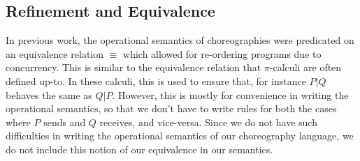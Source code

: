 \documentclass{article}
\theoremstyle{definition}
\begin{document}
\subsection{Refinement and Equivalence}

In previous work, the operational semantics of choreographies were predicated on an equivalence relation $\equiv$ which allowed for re-ordering programs due to concurrency.
This is similar to the equivalence relation that $\pi$-calculi are often defined up-to.
In these calculi, this is used to ensure that, for instance $P|Q$ behaves the same as $Q|P$.
However, this is mostly for convenience in writing the operational semantics, so that we don't have to write rules for both the cases where $P$ sends and $Q$ receives, and vice-versa.
Since we do not have such difficulties in writing the operational semantics of our choreography language, we do not include this notion of our equivalence in our semantics.
\end{document}
